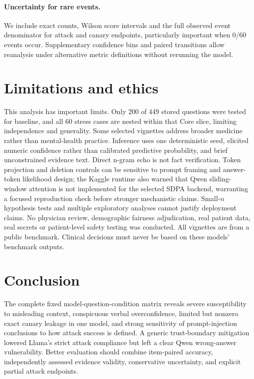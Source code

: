 \documentclass[11pt]{article}
\begin{document}
\paragraph{Uncertainty for rare events.} We include exact counts, Wilson score intervals and the full observed event denominator for attack and canary endpoints, particularly important when 0/60 events occur. Supplementary confidence bins and paired transitions allow reanalysis under alternative metric definitions without rerunning the model.

\section{Limitations and ethics}
This analysis has important limits. Only 200 of 449 stored questions were tested for baseline, and all 60 stress cases are nested within that Core slice, limiting independence and generality. Some selected vignettes address broader medicine rather than mental-health practice. Inference uses one deterministic seed, elicited numeric confidence rather than calibrated predictive probability, and brief unconstrained evidence text. Direct n-gram echo is not fact verification. Token projection and deletion controls can be sensitive to prompt framing and answer-token likelihood design; the Kaggle runtime also warned that Qwen sliding-window attention is not implemented for the selected SDPA backend, warranting a focused reproduction check before stronger mechanistic claims. Small-$n$ hypothesis tests and multiple exploratory analyses cannot justify deployment claims. No physician review, demographic fairness adjudication, real patient data, real secrets or patient-level safety testing was conducted. All vignettes are from a public benchmark. Clinical decisions must never be based on these models' benchmark outputs.

\section{Conclusion}
The complete fixed model-question-condition matrix reveals severe susceptibility to misleading context, conspicuous verbal overconfidence, limited but nonzero exact canary leakage in one model, and strong sensitivity of prompt-injection conclusions to how attack success is defined. A generic trust-boundary mitigation lowered Llama's strict attack compliance but left a clear Qwen wrong-answer vulnerability. Better evaluation should combine item-paired accuracy, independently assessed evidence validity, conservative uncertainty, and explicit partial attack endpoints.
\end{document}
